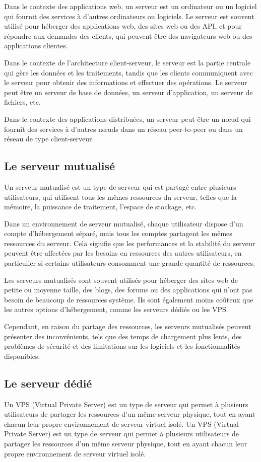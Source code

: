 Dans le contexte des applications web, un serveur est un ordinateur ou un logiciel qui fournit des services à d'autres ordinateurs ou logiciels. Le serveur est souvent utilisé pour héberger des applications web, des sites web ou des API, et pour répondre aux demandes des clients, qui peuvent être des navigateurs web ou des applications clientes.

Dans le contexte de l'architecture client-serveur, le serveur est la partie centrale qui gère les données et les traitements, tandis que les clients communiquent avec le serveur pour obtenir des informations et effectuer des opérations. Le serveur peut être un serveur de base de données, un serveur d'application, un serveur de fichiers, etc.

Dans le contexte des applications distribuées, un serveur peut être un nœud qui fournit des services à d'autres nœuds dans un réseau peer-to-peer ou dans un réseau de type client-serveur.

\subsection{Le serveur mutualisé}\label{subsec:serveur-mutualise}
Un serveur mutualisé est un type de serveur qui est partagé entre plusieurs utilisateurs, qui utilisent tous les mêmes ressources du serveur, telles que la mémoire, la puissance de traitement, l'espace de stockage, etc.

Dans un environnement de serveur mutualisé, chaque utilisateur dispose d'un compte d'hébergement séparé, mais tous les comptes partagent les mêmes ressources du serveur. Cela signifie que les performances et la stabilité du serveur peuvent être affectées par les besoins en ressources des autres utilisateurs, en particulier si certains utilisateurs consomment une grande quantité de ressources.

Les serveurs mutualisés sont souvent utilisés pour héberger des sites web de petite ou moyenne taille, des blogs, des forums ou des applications qui n'ont pas besoin de beaucoup de ressources système. Ils sont également moins coûteux que les autres options d'hébergement, comme les serveurs dédiés ou les VPS.

Cependant, en raison du partage des ressources, les serveurs mutualisés peuvent présenter des inconvénients, tels que des temps de chargement plus lents, des problèmes de sécurité et des limitations sur les logiciels et les fonctionnalités disponibles.

\subsection{Le serveur dédié}\label{subsec:serveur-dedie}
Un VPS (Virtual Private Server) est un type de serveur qui permet à plusieurs utilisateurs de partager les ressources d'un même serveur physique, tout en ayant chacun leur propre environnement de serveur virtuel isolé.
Un VPS (Virtual Private Server) est un type de serveur qui permet à plusieurs utilisateurs de partager les ressources d'un même serveur physique, tout en ayant chacun leur propre environnement de serveur virtuel isolé.

